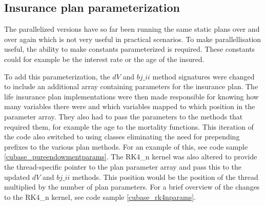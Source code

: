 \begin{table}[h!]
\centering
{}
\caption{F\# Alea.cuBase calculations per ms with double precision\label{table:cubaseManualdoubletime}}
\end{table}

\subsection{Insurance plan parameterization}\label{sub:manual_parameterization}
The parallelized versions have so far been running the same static plans over and over again which is not very useful in practical scenarios.
To make parallellisation useful, the ability to make constants parameterized is required.
These constants could for example be the interest rate or the age of the insured.

To add this parameterization, the $dV$ and $bj\_ii$ method signatures were changed to include an additional array containing parameters for the insurance plan.
The life insurance plan implementations were then made responsible for knowing how many variables there were and which variables mapped to which position in the parameter array. 
They also had to pass the parameters to the methods that required them, for example the age to the mortality functions.
This iteration of the code also switched to using classes eliminating the need for prepending prefixes to the various plan methods.
For an example of this, see code sample \ref{cubase_pureendowmentparams}.
The RK4\_n kernel was also altered to provide the thread-specific pointer to the plan parameter array and pass this to the updated $dV$ and $bj\_ii$ methods.
This position would be the position of the thread multiplied by the number of plan parameters.
For a brief overview of the changes to the RK4\_n kernel, see code sample \ref{cubase_rk4nparams}.

